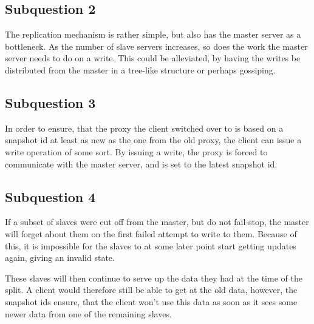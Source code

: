 \documentclass[11pt,a4paper]{article}
\begin{document}

\subsection*{Subquestion 2}

The replication mechanism is rather simple, but also has the master server
as a bottleneck. As the number of slave servers increases, so does the work
the master server needs to do on a write. This could be alleviated, by having
the writes be distributed from the master in a tree-like structure or perhaps
gossiping.


\subsection*{Subquestion 3}

In order to ensure, that the proxy the client switched over to is based on
a snapshot id at least as new as the one from the old proxy, the client can
issue a write operation of some sort. By issuing a write, the proxy is forced
to communicate with the master server, and is set to the latest snapshot id.

\subsection*{Subquestion 4}

If a subset of slaves were cut off from the master, but do not fail-stop, the
master will forget about them on the first failed attempt to write to them.
Because of this, it is impossible for the slaves to at some later point start
getting updates again, giving an invalid state.

These slaves will then continue to serve up the data they had at the time of
the split. A client would therefore still be able to get at the old data,
however, the snapshot ids ensure, that the client won't use this data as soon
as it sees some newer data from one of the remaining slaves.
\end{document}
